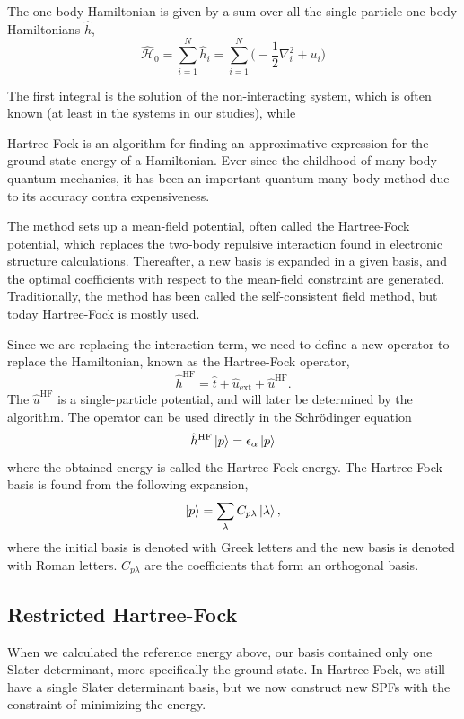The one-body Hamiltonian is given by a sum over all the single-particle one-body Hamiltonians $\hat{h}$,
\begin{equation}
\hat{\mathcal{H}}_0=\sum_{i=1}^N\hat{h}_i=\sum_{i=1}^N\Big(-\frac{1}{2}\nabla_i^2 + u_i\Big)
\end{equation}

The first integral is the solution of the non-interacting system, which is often known (at least in the systems in our studies), while 

Hartree-Fock is an algorithm for finding an approximative expression for the ground state energy of a Hamiltonian. Ever since the childhood of many-body quantum mechanics, it has been an important quantum many-body method due to its accuracy contra expensiveness. 

The method sets up a mean-field potential, often called the Hartree-Fock potential, which replaces the two-body repulsive interaction found in electronic structure calculations. Thereafter, a new basis is expanded in a given basis, and the optimal coefficients with respect to the mean-field constraint are generated. Traditionally, the method has been called the self-consistent field method, but today Hartree-Fock is mostly used. 

Since we are replacing the interaction term, we need to define a new operator to replace the Hamiltonian, known as the Hartree-Fock operator,
\begin{equation}
\hat{h}^{\text{HF}}=\hat{t} + \hat{u}_{\text{ext}} + \hat{u}^{\text{HF}}.
\end{equation}
The $\hat{u}^{\text{HF}}$ is a single-particle potential, and will later be determined by the algorithm. The operator can be used directly in the Schrödinger equation 
\begin{equation}
\hat{h}^{\text{HF}}\ket{p}=\epsilon_{\alpha}\ket{p}
\end{equation}
where the obtained energy is called the Hartree-Fock energy. The Hartree-Fock basis is found from the following expansion,
\begin{equation}
\ket{p}=\sum_{\lambda}C_{p\lambda}\ket{\lambda},
\end{equation}
where the initial basis is denoted with Greek letters and the new basis is denoted with Roman letters. $C_{p\lambda}$ are the coefficients that form an orthogonal basis. 

\subsection{Restricted Hartree-Fock}
When we calculated the reference energy above, our basis contained only one Slater determinant, more specifically the ground state. In Hartree-Fock, we still have a single Slater determinant basis, but we now construct new SPFs with the constraint of minimizing the energy. 

